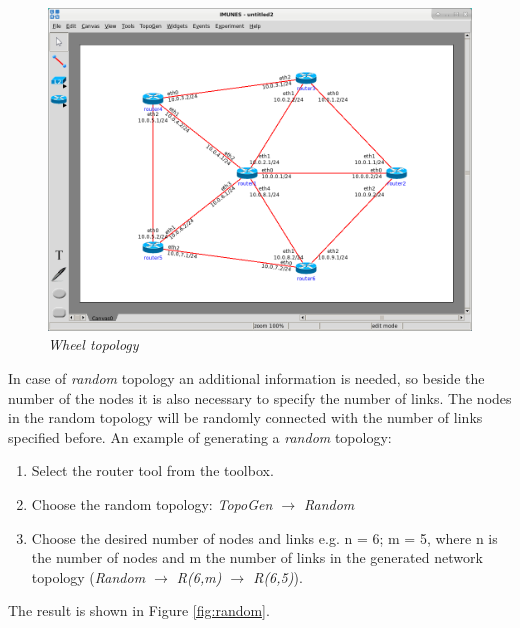 \begin{figure}[H]
\centering
\includegraphics[width=\textwidth]{./images/wheel.png}
\caption{\emph{Wheel topology}}
\label{fig:wheel}
\end{figure}  

In case of \emph{random} topology an additional information is needed, so
beside the number of the nodes it is also necessary to specify the number of
links. The nodes in the random topology will be randomly connected with the
number of links specified before. An example of generating a \emph{random}
topology: 
  \begin{enumerate}
  \item Select the router tool from the toolbox.
  \item Choose the random topology: \emph{TopoGen $\to$ Random}
  \item Choose the desired number of nodes and links e.g. n = 6; m = 5, where n
is the number of nodes and  m  the number of links in the generated network
topology (\emph{Random $\to$ R(6,m) $\to$ R(6,5)}). 
 \end{enumerate}
 The result is shown in Figure \ref{fig:random}. 
 
